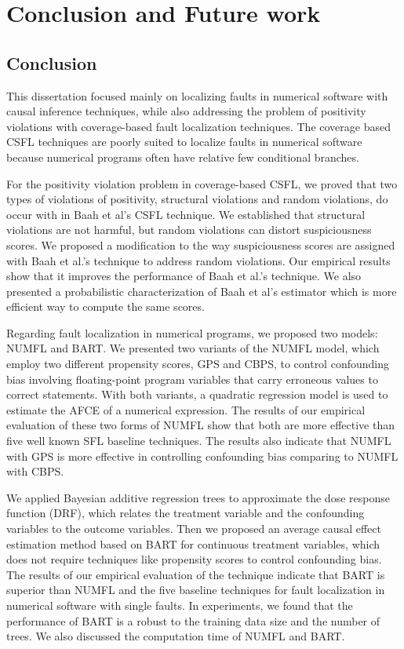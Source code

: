 \chapter{Conclusion and Future work}\label{conclusion}
\section{Conclusion}
This dissertation focused mainly on localizing faults in numerical software with causal inference techniques, while also addressing the problem of positivity violations with coverage-based fault localization techniques.  The coverage based CSFL techniques are  poorly suited to localize faults in numerical software because numerical programs often have relative few conditional branches.

For the positivity violation problem in coverage-based CSFL, we proved that two types of violations of positivity, structural violations and random violations, do occur with in Baah et al’s CSFL technique. We established that structural violations are not harmful, but random violations can distort suspiciousness scores.  We proposed a modification to the way suspiciousness scores are assigned with Baah et al.’s technique to address random violations.  Our empirical results show that it improves the performance of Baah et al.’s technique. We also presented a probabilistic characterization of Baah et al’s estimator which is more efficient way to compute the same scores. 

Regarding fault localization in numerical programs, we proposed two models: NUMFL and BART.  We presented two variants of the NUMFL model, which employ two different propensity scores, GPS and CBPS, to control confounding bias involving floating-point program variables that carry erroneous values to correct statements.  With both variants, a quadratic regression model is used to estimate the AFCE of a numerical expression. The results of our empirical evaluation of these two forms of NUMFL show that both are more effective than five well known SFL baseline techniques. The results also indicate that NUMFL with GPS is more effective in controlling confounding bias comparing to NUMFL with CBPS.  

We applied Bayesian additive regression trees to approximate the dose response function (DRF), which relates the treatment variable and the confounding variables to the outcome variables. Then we proposed an average causal effect estimation method based on BART for continuous treatment variables, which does not require techniques like propensity scores to control confounding bias. The results of our empirical evaluation of the technique indicate that BART is superior than NUMFL and the five baseline techniques for fault localization in numerical software with single faults. In experiments, we found that the performance of BART is a robust to the training data size and the number of trees. We also discussed the computation time of NUMFL and BART. 

